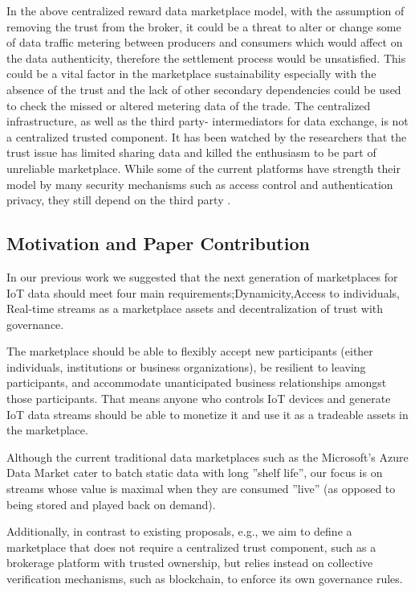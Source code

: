 \documentclass[letterpaper, 10 pt, conference]{ieeeconf}  %
\begin{document}
In the above centralized reward data marketplace model, with the assumption of removing the trust from the broker, it could be a threat to alter or change some of data traffic metering between producers and consumers which would affect on the data authenticity, therefore the settlement process would be unsatisfied. This could be a vital factor in the marketplace sustainability especially with the absence of the trust and the lack of other secondary dependencies could be used to check the missed or altered metering data of the trade.
The centralized infrastructure, as well as the third party- intermediators for data exchange, is not a centralized trusted component. It has been watched by the researchers that the trust issue has limited sharing data and killed the enthusiasm to be part of unreliable marketplace. While some of the current platforms have strength their model by many security mechanisms such as access control and authentication privacy, they still depend on the third party \cite{12}.

\subsection{Motivation and Paper Contribution} \label{Motivation&Contribution}


In our previous work\cite{Missier2017} we suggested that the next generation of marketplaces for IoT data  should meet four main requirements;Dynamicity,Access to individuals, Real-time streams as a marketplace assets and decentralization of trust with governance.

 The marketplace should be able to flexibly accept new participants (either individuals, institutions or business organizations), be resilient to leaving participants, and accommodate unanticipated business relationships amongst those participants. That means anyone who controls IoT devices and generate IoT data streams should be able to monetize it and use it as a tradeable assets in the marketplace.
 
Although the current traditional data marketplaces such as the Microsoft's Azure Data Market \cite{22} cater to batch static data with long ''shelf life'', our focus is on streams whose value is maximal when they are consumed ''live'' (as opposed to being stored and played back on demand).

Additionally, in contrast to existing proposals, e.g.\cite{Cao:2016:MMR:2926746.2883611}, we aim to define a marketplace that does not require a centralized trust component, such as a brokerage platform with trusted ownership, but relies instead on collective verification mechanisms, such as blockchain, to enforce its own governance rules.
\end{document}
